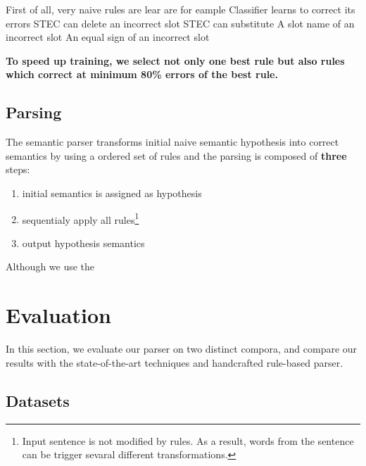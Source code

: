 \documentclass[11pt]{article}
\begin{document}
First of all, very naive rules are lear are for eample 
Classifier learns to correct its errors
STEC can delete an incorrect slot
STEC can substitute
A slot name of an incorrect slot
An equal sign of an incorrect slot

\textbf{To speed up training, we select not only one best rule but also rules which correct at minimum 80\% errors of the best rule. }

\subsection{Parsing}
The semantic parser transforms initial naive semantic hypothesis into correct semantics by using a ordered set of rules and the parsing is composed of \textbf{three} steps: 
\begin{enumerate}
  \item initial semantics is assigned as hypothesis
  \item sequentialy apply all rules\footnote{Input sentence is not modified by rules. As a result, words from the sentence can be trigger sevaral different transformations.}
  \item output hypothesis semantics
\end{enumerate}






Although we use the 


\section{Evaluation}

In this section, we evaluate our parser on two distinct compora, and compare our results with the state-of-the-art techniques and handcrafted rule-based parser. 

\subsection{Datasets}
\end{document}
